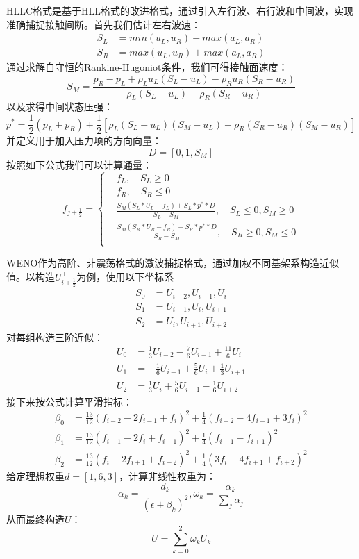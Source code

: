 \documentclass[12pt,a4paper]{article}%
\begin{document}
		HLLC格式是基于HLL格式的改进格式，通过引入左行波、右行波和中间波，实现准确捕捉接触间断。首先我们估计左右波速：
		\[
		\begin{aligned}
			S_L &= min(u_L,u_R) - max(a_L,a_R) \\
			S_R &= max(u_L,u_R) + max(a_L,a_R)
		\end{aligned}
		\]
		通过求解自守恒的Rankine-Hugoniot条件，我们可得接触面速度：
		\[
			S_M = \frac{p_R - p_L + \rho_L u_L(S_L - u_L) - \rho_R u_R(S_R - u_R)}{\rho_L(S_L - u_L) - \rho_R(S_R - u_R)}
		\]
		以及求得中间状态压强：
		\[
			p^* = \frac12 (p_L+p_R)+\frac12[\rho_L(S_L-u_L)(S_M-u_L)+\rho_R(S_R-u_R)(S_M-u_R)]
		\]
		并定义用于加入压力项的方向向量：
		\[
			D = [0,1,S_M]
		\]
		按照如下公式我们可以计算通量：
		\[
			f_{j+\frac12} = 
			\left\{
				\begin{aligned}
					& f_L, \quad S_L \geq 0 \\
					& f_R, \quad S_R \leq 0 \\
					& \frac{S_M(S_L*U_L-f_L)+S_L*p^**D}{S_L - S_M}, \quad S_L\leq0,S_M\geq0 \\
					& \frac{S_M(S_R*U_R-f_R)+S_R*p^**D}{S_R - S_M}, \quad S_R\geq0,S_M\leq0 \\
				\end{aligned}
			\right.
		\]
		
		WENO作为高阶、非震荡格式的激波捕捉格式，通过加权不同基架系构造近似值。以构造$U_{i+\frac12}^+$为例，使用以下坐标系
		\[
			\begin{aligned}
				S_0 &= {U_{i-2},U_{i-1},U_{i}} \\
				S_1 &= {U_{i-1},U_i,U_{i+1}} \\
				S_2 &= {U_{i},U_{i+1},U_{i+2}}
			\end{aligned}
		\]
		对每组构造三阶近似：
		\[
			\begin{aligned}
				U_0 &= \frac13 U_{i-2} - \frac76 U_{i-1} + \frac{11}{6} U_{i} \\
				U_1 &= -\frac16 U_{i-1} + \frac56 U_{i} + \frac13 U_{i+1} \\
				U_2 &= \frac13 U_{i} + \frac56 U_{i+1} -\frac16 U_{i+2}
			\end{aligned}
		\]
		接下来按公式计算平滑指标：
		\[
			\begin{aligned}
				\beta_0 &= \frac{13}{12}(f_{i-2} - 2f_{i-1} + f_i)^2 + \frac{1}{4}(f_{i-2} - 4f_{i-1} + 3f_i)^2 \\
				\beta_1 &= \frac{13}{12}(f_{i-1} - 2f_i + f_{i+1})^2 + \frac{1}{4}(f_{i-1} - f_{i+1})^2 \\
				\beta_2 &= \frac{13}{12}(f_i - 2f_{i+1} + f_{i+2})^2 + \frac{1}{4}(3f_i - 4f_{i+1} + f_{i+2})^2
			\end{aligned}
		\]
		给定理想权重$d=[1,6,3]$，计算非线性权重为：
		\[
			\alpha_k = \frac{d_k}{(\epsilon + \beta_k)^2},\omega_k = \frac{\alpha_k}{\sum_j\alpha_j}
		\]
		从而最终构造$U$：
		\[
			U = \sum_{k=0}^{2} \omega_k U_k
		\]
		
\end{document}

